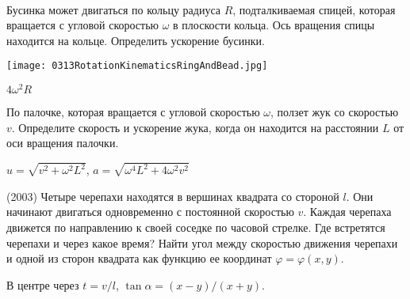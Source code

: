 \begin{ex}
\hspace{0pt} \\
\begin{minipage}{.65\textwidth}
Бусинка может двигаться по кольцу радиуса $R$, подталкиваемая спицей, которая вращается с угловой скоростью $\omega$ в плоскости кольца. Ось вращения спицы находится на кольце. Определить ускорение бусинки.
\end{minipage}
\begin{minipage}{.35\textwidth}
\centering
\texttt{[image: 0313RotationKinematicsRingAndBead.jpg]}
\end{minipage}
\begin{ans}
$4 \omega^2 R$
\end{ans}
\end{ex}

\begin{ex}
По палочке, которая вращается с угловой скоростью $\omega$, ползет жук со скоростью $v$. Определите скорость и ускорение жука, когда он находится на расстоянии $L$ от оси вращения палочки.
\begin{ans}
$u = \sqrt{v^2 + \omega^2 L^2}$, $a = \sqrt{\omega^4 L^2 + 4\omega^2 v^2}$
\end{ans}
\end{ex}

\begin{ex}
(2003) Четыре черепахи находятся в вершинах квадрата со стороной $l$. Они начинают двигаться одновременно с постоянной скоростью $v$. Каждая черепаха движется по направлению к своей соседке по часовой стрелке. Где встретятся черепахи и через какое время? Найти угол между скоростью движения черепахи и одной из сторон квадрата как функцию ее координат $\varphi = \varphi (x,y)$.
\begin{ans}
В центре через $t = v/l$, $\tan \alpha = (x-y)/(x+y)$.
\end{ans}
\end{ex}